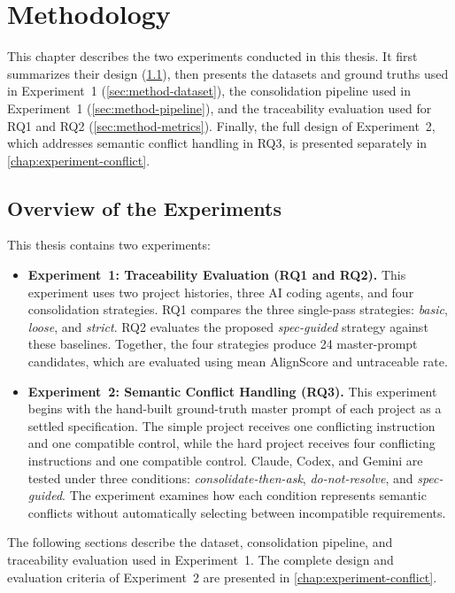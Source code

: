 \chapter{Methodology}
\label{chap:methodology}

This chapter describes the two experiments conducted in this thesis. It first
summarizes their design (\cref{sec:method-overview}), then presents the
datasets and ground truths used in Experiment~1 (\cref{sec:method-dataset}),
the consolidation pipeline used in Experiment~1 (\cref{sec:method-pipeline}), and the
traceability evaluation used for RQ1 and RQ2
(\cref{sec:method-metrics}). Finally, the full design of Experiment~2, which
addresses semantic conflict handling in RQ3, is presented separately in
\cref{chap:experiment-conflict}.

\section{Overview of the Experiments}
\label{sec:method-overview}

This thesis contains two experiments:

\begin{itemize}[leftmargin=*]
  \item \textbf{Experiment~1: Traceability Evaluation (RQ1 and RQ2).}
  This experiment uses two project histories, three AI coding agents, and four
  consolidation strategies. RQ1 compares the three single-pass strategies:
  \emph{basic}, \emph{loose}, and \emph{strict}. RQ2 evaluates the proposed
  \emph{spec-guided} strategy against these baselines. Together, the four
  strategies produce 24 master-prompt candidates, which are evaluated using
  mean AlignScore and untraceable rate.
  \item \textbf{Experiment~2: Semantic Conflict Handling (RQ3).}
  This experiment begins with the hand-built ground-truth master prompt of each
  project as a settled specification. The simple project receives one
  conflicting instruction and one compatible control, while the hard project
  receives four conflicting instructions and one compatible control. Claude,
  Codex, and Gemini are tested under three conditions:
  \emph{consolidate-then-ask}, \emph{do-not-resolve}, and
  \emph{spec-guided}. The experiment examines how each condition represents
  semantic conflicts without automatically selecting between incompatible
  requirements.
\end{itemize}

The following sections describe the dataset, consolidation pipeline, and
traceability evaluation used in Experiment~1. The complete design and evaluation criteria
of Experiment~2 are presented in
\cref{chap:experiment-conflict}.

